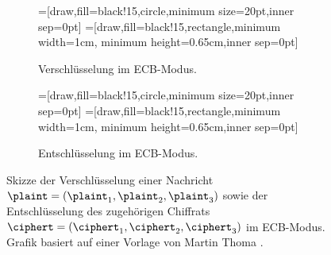 \begin{figure}[h]
	\centering
	\begin{subfigure}[h]{.45\textwidth}
		\centering
		=[draw,fill=black!15,circle,minimum size=20pt,inner sep=0pt]
		=[draw,fill=black!15,rectangle,minimum width=1cm, minimum height=0.65cm,inner sep=0pt]
		\caption{Verschlüsselung im ECB-Modus.}
	\end{subfigure}
	\hfill
	\begin{subfigure}[h]{.45\textwidth}
		\centering
		=[draw,fill=black!15,circle,minimum size=20pt,inner sep=0pt]
		=[draw,fill=black!15,rectangle,minimum width=1cm, minimum height=0.65cm,inner sep=0pt]
		\caption{Entschlüsselung im ECB-Modus.}
	\end{subfigure}
	\caption{Skizze der Verschlüsselung einer Nachricht $\plaint = (\plaint_{1},\plaint_{2},\plaint_{3})$ sowie der Entschlüsselung des zugehörigen Chiffrats $\ciphert = (\ciphert_{1},\ciphert_{2},\ciphert_{3})$ im ECB-Modus. Grafik basiert auf einer Vorlage von Martin Thoma \cite{Thoma2013}.}
\end{figure}

